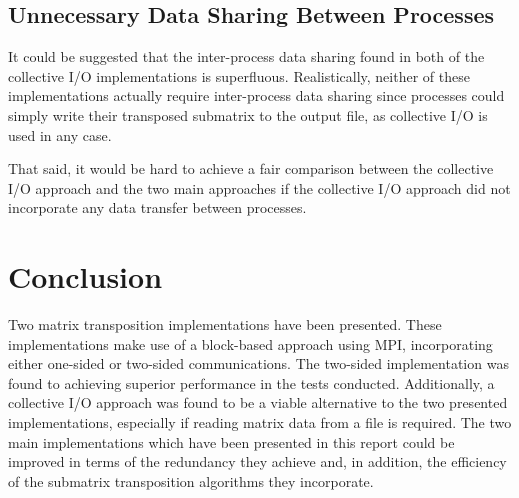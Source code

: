 \documentclass[journal,10pt,a4paper]{IEEEtran}
\begin{document}
\subsection{Unnecessary Data Sharing Between Processes}
It could be suggested that the inter-process data sharing found in both of the collective I/O implementations is superfluous. Realistically, neither of these implementations actually require inter-process data sharing since processes could simply write their transposed submatrix to the output file, as collective I/O is used in any case. 

That said, it would be hard to achieve a fair comparison between the collective I/O approach and the two main approaches if the collective I/O approach did not incorporate any data transfer between processes.




\section{Conclusion}
Two matrix transposition implementations have been presented. These implementations make use of a block-based approach using MPI, incorporating either one-sided or two-sided communications. The two-sided implementation was found to achieving superior performance in the tests conducted. Additionally, a collective I/O approach was found to be a viable alternative to the two presented implementations, especially if reading matrix data from a file is required. The two main implementations which have been presented in this report could be improved in terms of the redundancy they achieve and, in addition, the efficiency of the submatrix transposition algorithms they incorporate.


\clearpage
\onecolumn

\printbibliography





\ifCLASSOPTIONcaptionsoff
  \newpage
\fi





%
%
%
\end{document}
